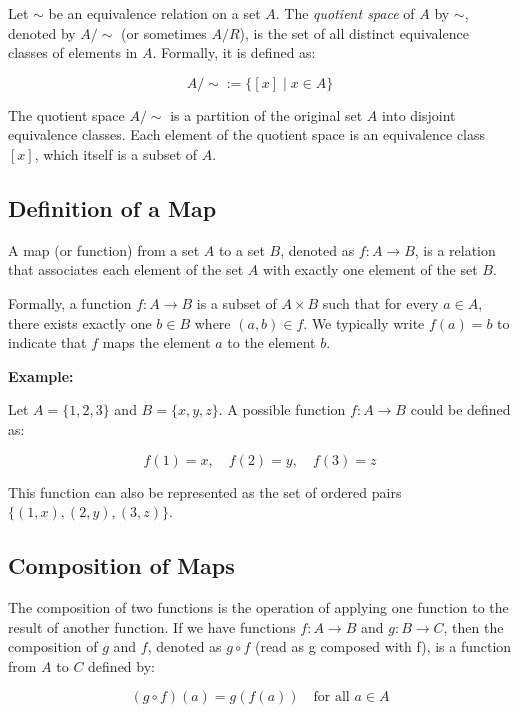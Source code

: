 Let \(\sim\) be an equivalence relation on a set \(A\). The \emph{quotient space} of \(A\) by \(\sim\), 
denoted by \(A/\sim\) (or sometimes \(A/R\)), is the set of all distinct equivalence classes of elements 
in \(A\). Formally, it is defined as:

\[
	A/\sim := \{[x] \mid x \in A\}
\]

The quotient space \(A/\sim\) is a partition of the original set \(A\) into disjoint equivalence classes. 
Each element of the quotient space is an equivalence class \([x]\), which itself is a subset of \(A\).

\subsection{Definition of a Map}

A map (or function) from a set \(A\) to a set \(B\), denoted as \(f: A \to B\), is a relation that 
associates each element of the set \(A\) with exactly one element of the set \(B\).

Formally, a function \(f: A \to B\) is a subset of \(A \times B\) such that for every \(a \in A\), there 
exists exactly one \(b \in B\) where \((a,b) \in f\). We typically write \(f(a) = b\) to indicate that 
\(f\) maps the element \(a\) to the element \(b\).
\vspace{\baselineskip}

\textbf{Example:}
\vspace{\baselineskip}

Let \(A = \{1, 2, 3\}\) and \(B = \{x, y, z\}\). A possible function \(f: A \to B\) could be defined as:

\[
	f(1) = x, \quad f(2) = y, \quad f(3) = z
\]

This function can also be represented as the set of ordered pairs \(\{(1,x), (2,y), (3,z)\}\).

\subsection{Composition of Maps}

The composition of two functions is the operation of applying one function to the result of another 
function. If we have functions \(f: A \to B\) and \(g: B \rightarrow C\), then the composition of \(g\) 
and \(f\), denoted as \(g \circ f\) (read as g composed with f), is a function from \(A\) to \(C\) defined 
by:

\[
	(g \circ f)(a) = g(f(a)) \quad \text{for all } a \in A
\]

